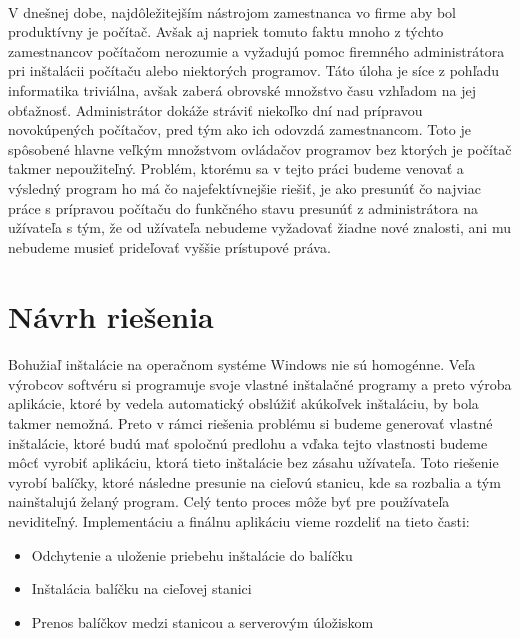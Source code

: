 \paragraph{}
V dnešnej dobe, najdôležitejším nástrojom  zamestnanca vo firme aby bol produktívny je počítač. Avšak aj napriek tomuto faktu mnoho z týchto zamestnancov počítačom nerozumie a vyžadujú pomoc firemného administrátora pri inštalácii počítaču alebo niektorých programov. Táto úloha je síce z pohľadu informatika triviálna, avšak zaberá obrovské množstvo času vzhľadom na jej obťažnosť. Administrátor dokáže stráviť niekoľko dní nad prípravou novokúpených  počítačov, pred tým ako ich odovzdá zamestnancom. Toto je spôsobené hlavne veľkým množstvom ovládačov programov bez ktorých je počítač takmer nepoužiteľný. 
Problém, ktorému sa v tejto práci budeme venovať a výsledný program ho má čo najefektívnejšie riešiť, je ako presunúť čo najviac práce s prípravou počítaču do funkčného stavu presunúť z administrátora na užívateľa s tým, že od užívateľa nebudeme vyžadovať žiadne nové znalosti, ani mu nebudeme musieť prideľovať vyššie prístupové práva.

\section{Návrh riešenia}

\paragraph{}
Bohužiaľ inštalácie na operačnom systéme Windows nie sú homogénne. Veľa výrobcov softvéru si programuje svoje vlastné inštalačné programy a preto výroba aplikácie, ktoré by vedela automatický obslúžiť akúkoľvek inštaláciu, by bola takmer nemožná. Preto v rámci riešenia problému si budeme generovať vlastné inštalácie, ktoré budú mať spoločnú predlohu a vďaka tejto vlastnosti budeme môcť vyrobiť aplikáciu, ktorá tieto inštalácie bez zásahu užívateľa.  Toto riešenie vyrobí balíčky, ktoré následne presunie na cieľovú stanicu, kde sa rozbalia a tým nainštalujú želaný program. Celý tento proces môže byť pre používateľa neviditeľný.  Implementáciu a finálnu aplikáciu vieme rozdeliť na tieto časti:

\begin{itemize}
\item Odchytenie a uloženie priebehu inštalácie do balíčku
\item Inštalácia balíčku na cieľovej stanici
\item Prenos balíčkov medzi stanicou a serverovým úložiskom
\end{itemize}

